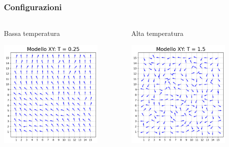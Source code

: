 \begin{frame}
    \frametitle{Configurazioni}
    \framesubtitle{}

    \begin{columns}
        \begin{column}{0.5\textwidth}
            \begin{block}{Bassa temperatura}

            \centering
            \includegraphics[width=0.8\textwidth]{Immagini/simXY/conf_T0.25.png}

            \end{block}
        \end{column}
    
        \begin{column}{0.5\textwidth}
            \begin{block}{Alta temperatura}

                \centering
                \includegraphics[width=0.8\textwidth]{Immagini/simXY/conf_T1.5.png}


\end{block}
\end{column}
\end{columns}
\end{frame}
